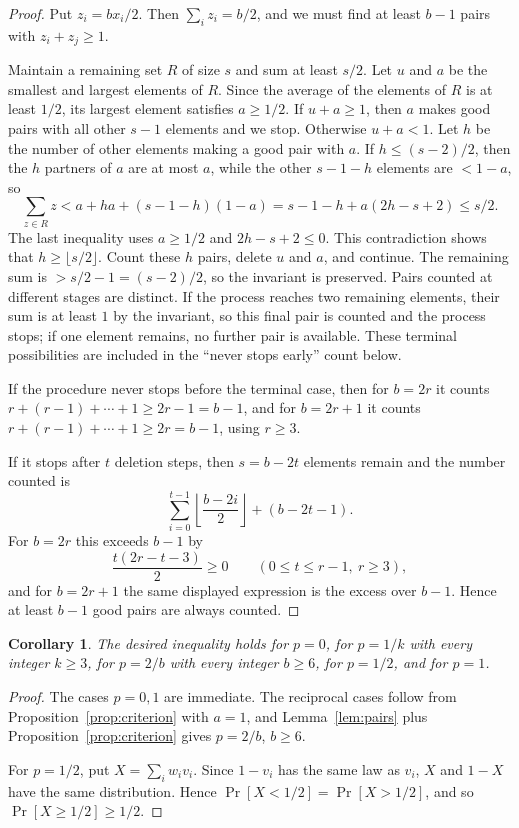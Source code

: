\documentclass[12pt]{article}
\newtheorem{corollary}{Corollary}
\begin{document}
\begin{proof}
Put \(z_i=bx_i/2\).  Then \(\sum_i z_i=b/2\), and we must find at least
\(b-1\) pairs with \(z_i+z_j\ge1\).

Maintain a remaining set \(R\) of size \(s\) and sum at least \(s/2\).  Let
\(u\) and \(a\) be the smallest and largest elements of \(R\).  Since the
average of the elements of \(R\) is at least \(1/2\), its largest element
satisfies \(a\ge1/2\).  If \(u+a\ge1\), then \(a\) makes good pairs with all
other \(s-1\) elements and we stop.  Otherwise \(u+a<1\).  Let \(h\) be the
number of other elements making a good pair with \(a\).  If \(h\le(s-2)/2\),
then the \(h\) partners of \(a\) are at most \(a\), while the other \(s-1-h\)
elements are \(<1-a\), so
\[
 \sum_{z\in R}z
   < a+ha+(s-1-h)(1-a)
   =s-1-h+a(2h-s+2)\le s/2.
\]
The last inequality uses \(a\ge1/2\) and \(2h-s+2\le0\).  This contradiction
shows that \(h\ge\lfloor s/2\rfloor\).  Count these \(h\) pairs, delete \(u\)
and \(a\), and continue.  The remaining sum is
\(>s/2-1=(s-2)/2\), so the invariant is preserved.  Pairs counted at different
stages are distinct.  If the process reaches two remaining elements, their sum is
at least \(1\) by the invariant, so this final pair is counted and the process
stops; if one element remains, no further pair is available.  These terminal
possibilities are included in the ``never stops early'' count below.

If the procedure never stops before the terminal case, then for \(b=2r\) it
counts
\(r+(r-1)+\cdots+1\ge2r-1=b-1\), and for \(b=2r+1\) it counts
\(r+(r-1)+\cdots+1\ge2r=b-1\), using \(r\ge3\).

If it stops after \(t\) deletion steps, then \(s=b-2t\) elements remain and the
number counted is
\[
       \sum_{i=0}^{t-1}\left\lfloor \frac{b-2i}{2}\right\rfloor+(b-2t-1).
\]
For \(b=2r\) this exceeds \(b-1\) by
\[
       \frac{t(2r-t-3)}{2}\ge0\qquad(0\le t\le r-1,\ r\ge3),
\]
and for \(b=2r+1\) the same displayed expression is the excess over \(b-1\).
Hence at least \(b-1\) good pairs are always counted.
\end{proof}

\begin{corollary}\label{cor:positive}
The desired inequality holds for \(p=0\), for \(p=1/k\) with every integer
\(k\ge3\), for \(p=2/b\) with every integer \(b\ge6\), for \(p=1/2\), and for
\(p=1\).
\end{corollary}

\begin{proof}
The cases \(p=0,1\) are immediate.  The reciprocal cases follow from
Proposition~\ref{prop:criterion} with \(a=1\), and Lemma~\ref{lem:pairs} plus
Proposition~\ref{prop:criterion} gives \(p=2/b\), \(b\ge6\).

For \(p=1/2\), put \(X=\sum_i w_i v_i\).  Since \(1-v_i\) has the same law as
\(v_i\), \(X\) and \(1-X\) have the same distribution.  Hence
\(\Pr[X<1/2]=\Pr[X>1/2]\), and so \(\Pr[X\ge1/2]\ge1/2\).
\end{proof}
\end{document}
